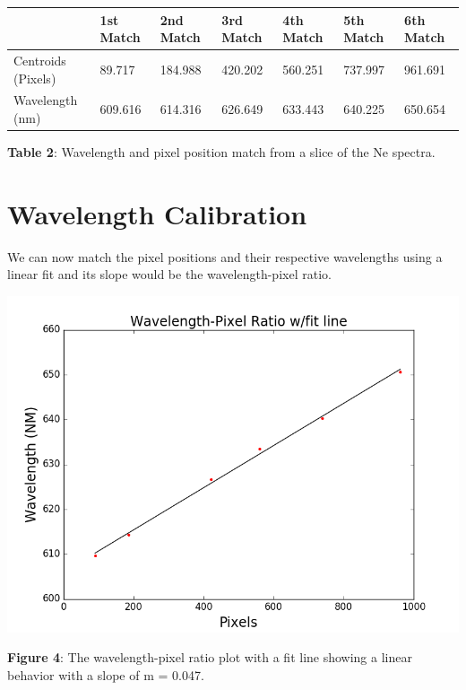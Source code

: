 \documentclass[onecolumn, 12pt, a4paper]{article}
\begin{document}
\hspace*{-.6cm}\begin{tabular}{ |p{2cm}|p{1.8cm}|p{1.8cm}|p{1.8cm}|p{1.8cm}|p{1.8cm}|p{1.8cm}| }

 \hline
  & 1st Match & 2nd Match & 3rd Match & 4th Match & 5th Match & 6th Match \\
 \hline
 Centroids (Pixels) & 89.717 & 184.988 & 420.202 & 560.251 & 737.997 & 961.691\\
 \hline
 Wavelength (nm) & 609.616 & 614.316 & 626.649 & 633.443 & 640.225 & 650.654 \\
 \hline
\end{tabular}
\leavevmode
\newline

\centerline{\textbf{Table 2}: Wavelength and pixel position match from a slice of the Ne spectra.}

\newline
\section{Wavelength Calibration}
\begin{flushleft}
We can now match the pixel positions and their respective wavelengths using a linear fit and its slope would be the wavelength-pixel ratio.
\end{flushleft}

\centerline{\includegraphics[scale=0.5]{figure_1-3.png}}

\textbf{Figure 4}: The wavelength-pixel ratio plot with a fit line showing a linear behavior with a slope of m = 0.047.
\end{document}
